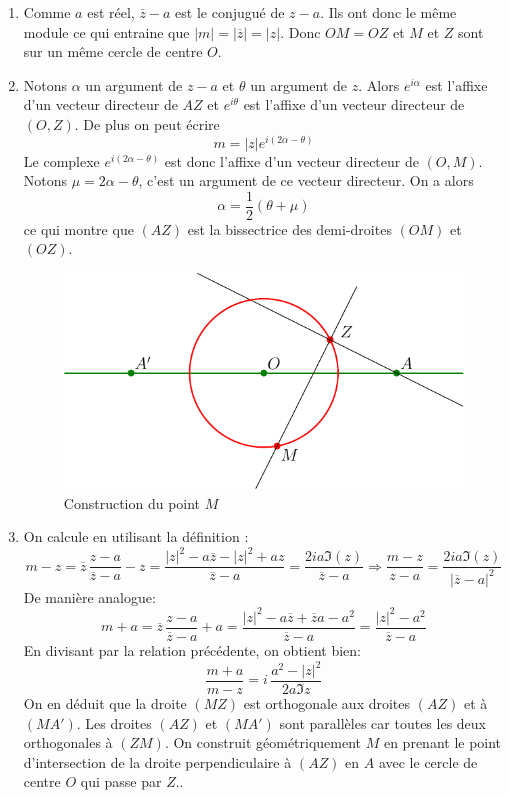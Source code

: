 \begin{enumerate}
 \item Comme $a$ est réel, $\overline{z}-a$ est le conjugué de $z-a$. Ils ont donc le même module ce qui entraine que $|m| = |\overline{z}|=|z|$. Donc $OM=OZ$ et $M$ et $Z$ sont sur un même cercle de centre $O$. 
 \item Notons $\alpha$ un argument de $z-a$ et $\theta$ un argument de $z$. Alors $e^{i\alpha}$ est l'affixe d'un vecteur directeur de $AZ$ et $e^{i\theta}$ est l'affixe d'un vecteur directeur de $(O,Z)$. De plus on peut écrire
\begin{displaymath}
 m = |z|e^{i(2\alpha - \theta)}
\end{displaymath}
Le complexe $e^{i(2\alpha - \theta)}$ est donc l'affixe d'un vecteur directeur de $(O,M)$. Notons $\mu = 2\alpha -\theta$, c'est un argument de ce vecteur directeur. On a alors
\begin{displaymath}
 \alpha = \frac{1}{2}(\theta + \mu)
\end{displaymath}
ce qui montre que $(AZ)$ est la bissectrice des demi-droites $(OM)$ et $(OZ)$.

\begin{figure}[!ht]
 \centering
 \includegraphics{Ccomp8_2.pdf}
 \caption{Construction du point $M$}
 \label{fig:Ccomp8_2}
\end{figure}

 \item On calcule en utilisant la définition :
\[
 m-z = \overline{z}\,\frac{z-a}{\overline{z}-a}-z
=\frac{|z|^2 - a\overline{z} -|z|^2 + az}{\overline{z}-a}
=\frac{2ia \Im(z)}{\overline{z}-a}
\Rightarrow
\frac{m-z}{z-a}=\frac{2ia \Im(z)}{|\overline{z}-a|^2}
\]
De manière analogue:
\begin{displaymath}
 m+a = \overline{z}\,\frac{z-a}{\overline{z}-a} +a
= \frac{|z|^2 - a\overline{z} +\overline{z}a -a^2}{\overline{z}-a}=\frac{|z|^2-a^2}{\overline{z}-a}
\end{displaymath}
En divisant par la relation précédente, on obtient bien:
\begin{displaymath}
 \frac{m+a}{m-z} = i\,\frac{a^2-|z|^2}{2a\Im z}
\end{displaymath}
On en déduit que la droite $(MZ)$ est orthogonale aux droites $(AZ)$ et à $(MA')$. Les droites $(AZ)$ et $(MA')$ sont parallèles car toutes les deux orthogonales à $(ZM)$.\newline
On construit géométriquement $M$ en prenant le point d'intersection de la droite perpendiculaire à $(AZ)$ en $A$ avec le cercle de centre $O$ qui passe par $Z$.. 
\end{enumerate}
